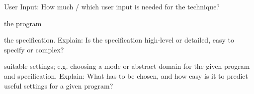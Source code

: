 \documentclass[a4paper]{article}
\begin{document}
\begin{minipage}[t]{0.16\linewidth}
\begin{betterlist}
\begin{betterlist}
		\end{betterlist}
		\item \alert{User Input:} How much / which user input is needed for the technique?
		\begin{betterlist}
			\item \checkboxChecked the program
			\item \checkboxHalfChecked the specification. Explain: Is the specification high-level or detailed, easy to specify or complex?

			\item \checkboxChecked suitable settings; e.g. choosing a mode or abstract domain for the given program and specification. Explain: What has to be chosen, and how easy is it to predict useful settings for a given program?


\end{betterlist}
\end{betterlist}
\end{minipage}
\end{document}
